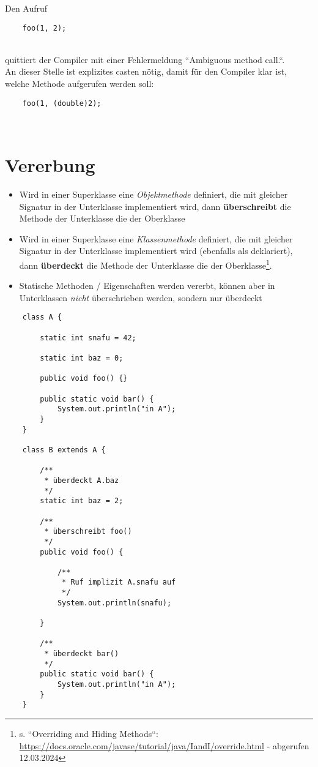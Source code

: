 Den Aufruf

\begin{verbatim}
    foo(1, 2);
\end{verbatim}\\

quittiert der Compiler mit einer Fehlermeldung ``Ambiguous method call.``.\\
An dieser Stelle ist explizites casten nötig, damit für den Compiler klar ist, welche Methode aufgerufen werden soll:

\begin{verbatim}
    foo(1, (double)2);
\end{verbatim}\\


\section{Vererbung}

\begin{itemize}
    \item Wird in einer Superklasse eine \textit{Objektmethode} definiert, die mit gleicher Signatur in der Unterklasse implementiert wird, dann \textbf{überschreibt} die Methode der Unterklasse die der Oberklasse
    \item Wird in einer Superklasse eine \textit{Klassenmethode} definiert, die mit gleicher Signatur in der Unterklasse implementiert wird (ebenfalls als  deklariert), dann \textbf{überdeckt} die Methode der Unterklasse die der Oberklasse\footnote{
        s. ``Overriding and Hiding Methods``: \url{https://docs.oracle.com/javase/tutorial/java/IandI/override.html} - abgerufen 12.03.2024
    }.
    \item Statische Methoden / Eigenschaften werden vererbt, können aber in Unterklassen \textit{nicht} überschrieben werden, sondern nur überdeckt
\end{itemize}

\begin{verbatim}
    class A {

        static int snafu = 42;

        static int baz = 0;

        public void foo() {}

        public static void bar() {
            System.out.println("in A");
        }
    }

    class B extends A {

        /**
         * überdeckt A.baz
         */
        static int baz = 2;

        /**
         * überschreibt foo()
         */
        public void foo() {

            /**
             * Ruf implizit A.snafu auf
             */
            System.out.println(snafu);

        }

        /**
         * überdeckt bar()
         */
        public static void bar() {
            System.out.println("in A");
        }
    }
\end{verbatim}
